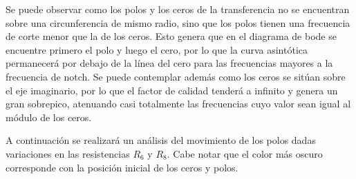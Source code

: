 \documentclass[a4paper]{article}
\begin{document}
Se puede observar como los polos y los ceros de la transferencia no se encuentran sobre una circunferencia de mismo radio, sino que los polos tienen una frecuencia de corte menor que la de los ceros. Esto genera que en el diagrama de bode se encuentre primero el polo y luego el cero, por lo que la curva asintótica permanecerá por debajo de la línea del cero para las frecuencias mayores a la frecuencia de notch. Se puede contemplar además como los ceros se sitúan sobre el eje imaginario, por lo que el factor de calidad tenderá a infinito y genera un gran sobrepico, atenuando casi totalmente las frecuencias cuyo valor sean igual al módulo de los ceros.


A continuación se realizará un análisis del movimiento de los polos dadas variaciones en las resistencias $R_6$ y $R_8$. Cabe notar que el color más oscuro corresponde con la posición inicial de los ceros y polos.
\end{document}
